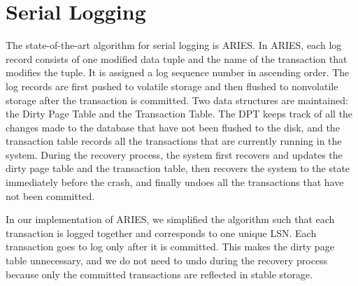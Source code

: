 \section{Serial Logging}

The state-of-the-art algorithm for serial logging is ARIES. In ARIES, each log record consists of one modified data tuple and the name of the transaction that modifies the tuple. It is assigned a log sequence number in ascending order. The log records are first pushed to volatile storage and then flushed to nonvolatile storage after the transaction is committed. Two data structures are maintained: the Dirty Page Table and the Transaction Table. The DPT keeps track of all the changes made to the database that have not been flushed to the disk, and the transaction table records all the transactions that are currently running in the system. During the recovery process, the system first recovers and updates the dirty page table and the transaction table, then recovers the system to the state immediately before the crash, and finally undoes all the transactions that have not been committed.



In our implementation of ARIES, we simplified the algorithm such that each transaction is logged together and corresponds to one unique LSN. Each transaction goes to log only after it is committed. This makes the dirty page table unnecessary, and we do not need to undo during the recovery process because only the committed transactions are reflected in stable storage. 